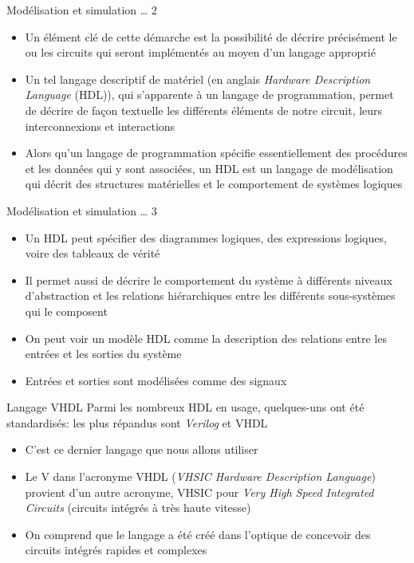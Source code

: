 \documentclass[presentation]{beamer}
\begin{document}
\begin{frame}[label={sec:orgf868f51}]{Modélisation et simulation \ldots{} 2}
\begin{itemize}
\item Un élément clé de cette démarche est la possibilité de décrire précisément le ou les circuits qui seront implémentés au moyen d'un langage approprié
\item Un tel \alert{langage descriptif de matériel} (en anglais \emph{Hardware Description Language} (HDL)), qui s'apparente à un langage de programmation, permet de décrire de façon textuelle les différents éléments de notre circuit, leurs interconnexions et interactions
\item Alors qu'un langage de programmation spécifie essentiellement des procédures et les données qui y sont associées, un HDL est un langage de modélisation qui décrit des structures matérielles et le comportement de systèmes logiques
\end{itemize}
\end{frame}

\begin{frame}[label={sec:org5d29e5f}]{Modélisation et simulation \ldots{} 3}
\begin{itemize}
\item Un HDL peut spécifier des diagrammes logiques, des expressions logiques, voire des tableaux de vérité
\item Il permet aussi de décrire le comportement du système à différents niveaux d'abstraction et les relations hiérarchiques entre les différents sous-systèmes qui le composent
\item On peut voir un modèle HDL comme la description des relations entre les entrées et les sorties du système
\item Entrées et sorties sont modélisées comme des \alert{signaux}
\end{itemize}
\end{frame}

\begin{frame}[label={sec:org84d5d18}]{Langage VHDL}
Parmi les nombreux HDL en usage, quelques-uns ont été standardisés: les plus répandus sont \emph{Verilog} et VHDL
\begin{itemize}
\item C'est ce dernier langage que nous allons utiliser
\item Le V dans l'acronyme VHDL (\emph{VHSIC Hardware Description Language}) provient d'un autre acronyme, VHSIC pour \emph{Very High Speed Integrated Circuits} (circuits intégrés à très haute vitesse)
\item On comprend que le langage a été créé dans l'optique de concevoir des circuits intégrés rapides et complexes
\end{itemize}
\end{frame}
\end{document}
